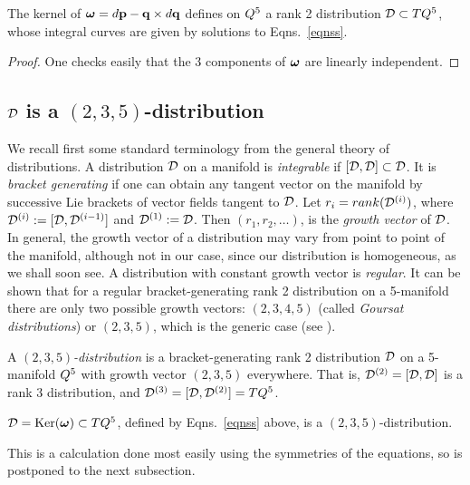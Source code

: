 \begin{proposition} The kernel of $\boldsymbol{\omega}=d{\mathbf p}-\mathbf q\times d\mathbf q$ defines on $Q^5$ a rank 2 distribution ${\mathcal D}\subset TQ^5$, whose integral curves are given by solutions to Eqns.~\eqref{eqnss}. 
\end{proposition}
\begin{proof} One checks easily that the 3 components of $\boldsymbol{\omega}$ are  linearly independent.
\end{proof}

\subsection{${\mathcal D}$ is a $(2,3,5)$-distribution}  
We recall first   some standard terminology  from the general theory of distributions.
A distribution ${\mathcal D}$ on a manifold  is {\em integrable} if $[{\mathcal D},{\mathcal D}]\subset{\mathcal D}$. It  is  {\em bracket generating} if one can obtain any tangent vector on the manifold by  successive Lie brackets of vector fields tangent to ${\mathcal D}$. Let $r_i=rank({\mathcal D}^{(i)})$, where ${\mathcal D}^{(i)}:= [{\mathcal D}, {\mathcal D}^{(i-1)}]$  and ${\mathcal D}^{(1)}:={\mathcal D}$. Then $(r_1, r_2, \ldots)$,  is the {\em growth
 vector} of ${\mathcal D}$. In general, the growth vector of a distribution may vary from point to point of the manifold, although not in our case, since our distribution is homogeneous, as we  shall soon see.  A distribution with constant growth vector is {\em regular}.  It can be shown that for  a regular  bracket-generating rank 2 distribution on  a 5-manifold there are only two possible growth vectors: $(2,3,4,5)$ (called {\em Goursat distributions}) or $(2,3,5)$, which is the generic case  (see \cite{BrHs}). 

\begin{definition} A {\em $(2,3,5)$-distribution} is  a bracket-generating  rank 2 distribution ${\mathcal D}$  on a 5-manifold $Q^5$ with growth vector $(2,3,5)$ everywhere. That is, ${\mathcal D}^{(2)}=[{\mathcal D},{\mathcal D}]$ is a rank 3 distribution, and 
${\mathcal D}^{(3)}=[{\mathcal D},{\mathcal D}^{(2)}]=TQ^5$. 
\end{definition}


\begin{proposition} \label{prop235} ${\mathcal D}={\rm Ker}(\boldsymbol{\omega})\subset TQ^5$, defined by Eqns.~\eqref{eqnss} above,  is a  $(2,3,5)$-distribution. 
\end{proposition}



 This is a calculation done most  easily  using the symmetries of the equations, so is postponed to the next subsection.



